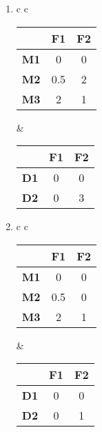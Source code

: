 \begin{enumerate}
\begin{table}[h]
\begin{tabular}{c c}
\begin{tabular}{|c|c|c|}
\hline
\textbf{} & \textbf{F1} & \textbf{F2} \\
\hline
\textbf{M1} & 0 & 0 \\
\textbf{M2} & 1 & 2 \\
\textbf{M3} & 2 & 1 \\
\hline
\end{tabular}
&
\begin{tabular}{|c|c|c|}
\hline
\textbf{} & \textbf{F1} & \textbf{F2} \\
\hline
\textbf{D1} & 0 & 0 \\
\textbf{D2} & 0.5 & 3 \\
\hline
\end{tabular}

\end{tabular}
\end{table}

\item
\begin{table}[H]
\centering
\begin{tabular}{c c}

\begin{tabular}{|c|c|c|}
\hline
\textbf{} & \textbf{F1} & \textbf{F2} \\
\hline
\textbf{M1} & 0 & 0 \\
\textbf{M2} & 0.5 & 2 \\
\textbf{M3} & 2 & 1 \\
\hline
\end{tabular}
&
\begin{tabular}{|c|c|c|}
\hline
\textbf{} & \textbf{F1} & \textbf{F2} \\
\hline
\textbf{D1} & 0 & 0 \\
\textbf{D2} & 0 & 3 \\
\hline
\end{tabular}

\end{tabular}
\end{table}

\item
\begin{table}[H]
\centering
\begin{tabular}{c c}

\begin{tabular}{|c|c|c|}
\hline
\textbf{} & \textbf{F1} & \textbf{F2} \\
\hline
\textbf{M1} & 0 & 0 \\
\textbf{M2} & 0.5 & 0 \\
\textbf{M3} & 2 & 1 \\
\hline
\end{tabular}
&
\begin{tabular}{|c|c|c|}
\hline
\textbf{} & \textbf{F1} & \textbf{F2} \\
\hline
\textbf{D1} & 0 & 0 \\
\textbf{D2} & 0 & 1 \\
\hline
\end{tabular}


\end{tabular}
\end{table}
\end{enumerate}
